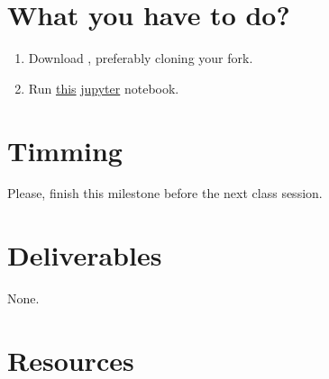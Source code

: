 \section{What you have to do?}

\begin{enumerate}
\item Download \theproject, preferably cloning your fork.
\item Run
  \href{https://github.com/Sistemas-Multimedia/Sistemas-Multimedia.github.io/blob/master/study_guide/04-the_data/display_video.ipynb}{this}
  \href{https://jupyter.org/}{jupyter} notebook.
\end{enumerate}

\section{Timming}

Please, finish this milestone before the next class session.

\section{Deliverables}

None.

\section{Resources}


